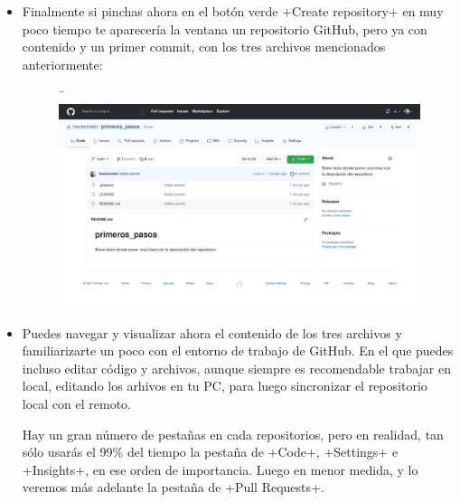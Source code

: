 \documentclass[a5paper, oneside,10pt]{article}
\begin{document}
\begin{itemize}
        \item Finalmente si pinchas ahora en el botón verde \cverb+Create repository+ en muy poco tiempo te aparecería la ventana un repositorio GitHub, pero ya con contenido y un primer commit, con los tres archivos mencionados anteriormente:
       
       \begin{figure}[H]¯
        \hspace{-1cm}\includegraphics[width=1.2\columnwidth]{github_new_repo}
       \end{figure}
       
        \item Puedes navegar y visualizar ahora el contenido de los tres archivos y familiarizarte un poco con el entorno de trabajo de GitHub. En el que puedes incluso editar código y archivos, aunque siempre es recomendable trabajar en local, editando los arhivos en tu PC, para luego sincronizar el repositorio local con el remoto. 
        
        Hay un gran número de pestañas en cada repositorios, pero en realidad, tan sólo usarás el 99\% del tiempo la pestaña de \cverb+Code+, \cverb+Settings+ e \cverb+Insights+, en ese orden de importancia. Luego en menor medida, y lo veremos más adelante la pestaña de \cverb+Pull Requests+.
       \end{itemize}
       
\end{document}
